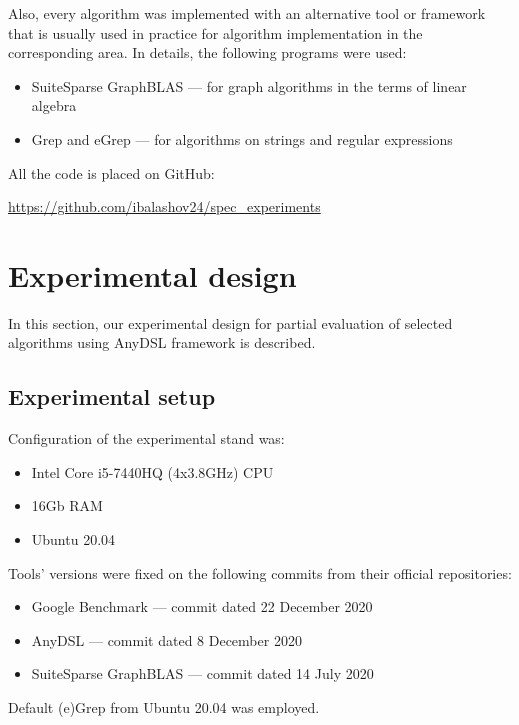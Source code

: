 \documentclass[conference]{IEEEtran}
\begin{document}
Also, every algorithm was implemented with an alternative tool or framework that is usually used in practice for algorithm implementation in the corresponding area. In details, the following programs were used:
\begin{itemize}
	\item SuiteSparse GraphBLAS \cite{moreira2018implementing} --- for graph algorithms in the terms of linear algebra
	\item Grep and eGrep --- for algorithms on strings and regular expressions
\end{itemize}


All the code is placed on GitHub:
\begin{center}
\href{https://github.com/ibalashov24/spec\_experiments}{https://github.com/ibalashov24/spec\_experiments}
\end{center}

\section{Experimental design}

In this section, our experimental design for partial evaluation of selected algorithms using AnyDSL framework is described.

\subsection{Experimental setup}

Configuration of the experimental stand was:
\begin{itemize}
	\item Intel Core i5-7440HQ (4x3.8GHz) CPU
	\item 16Gb RAM
	\item Ubuntu 20.04
\end{itemize}

Tools' versions were fixed on the following commits from their official repositories:
\begin{itemize}
	\item Google Benchmark \cite{gbenchmark} --- commit dated 22 December 2020
	\item AnyDSL \cite{leissa2018anydsl} --- commit dated 8 December 2020
	\item SuiteSparse GraphBLAS \cite{moreira2018implementing} --- commit dated 14 July 2020
\end{itemize}

Default (e)Grep from Ubuntu 20.04 was employed.
\end{document}
